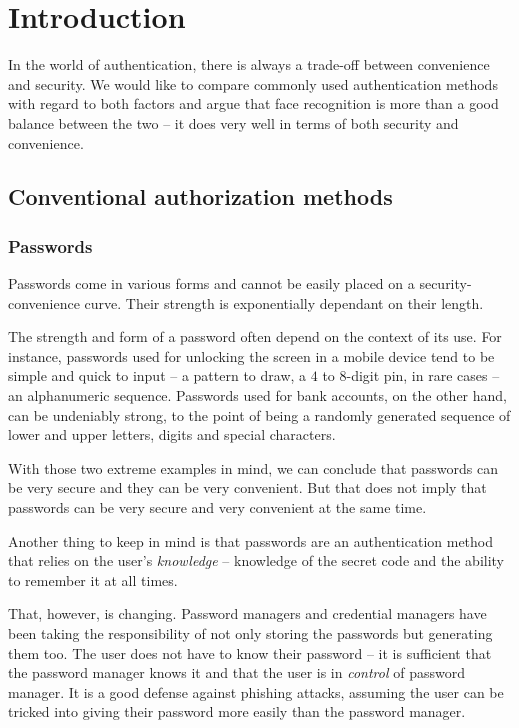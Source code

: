 \chapter{Introduction}
    In the world of authentication, there is always a trade-off between
    convenience and security. We would like to compare commonly used authentication
    methods with regard to both factors and argue that face recognition is more than
    a good balance between the two -- it does very well in terms of both security
    and convenience.

    \section{Conventional authorization methods}
        \subsection*{Passwords}
            Passwords come in various forms and cannot be easily placed on a
            security-convenience curve. Their strength is exponentially dependant
            on their length.

            The strength and form of a password often depend on the context of its
            use. For instance, passwords used for unlocking the screen in a mobile
            device tend to be simple and quick to input -- a pattern to draw, a
            $4$ to $8$-digit pin, in rare cases -- an alphanumeric sequence.
            Passwords used for bank accounts, on the other hand, can be undeniably
            strong, to the point of being a randomly generated sequence of lower
            and upper letters, digits and special characters.

            With those two extreme examples in mind, we can conclude that passwords
            can be very secure and they can be very convenient. But that does not
            imply that passwords can be very secure and very convenient at the
            same time.

            Another thing to keep in mind is that passwords are an authentication
            method that relies on the user's \textit{knowledge} -- knowledge of the
            secret code and the ability to remember it at all times.

            That, however, is changing. Password managers and credential managers have been taking
            the responsibility of not only storing the passwords but generating
            them too. The user does not have to know their password -- it is sufficient
            that the password manager knows it and that the user is in \textit{control}
            of password manager. It is a good defense against phishing attacks,
            assuming the user can be tricked into giving their password more
            easily than the password manager.


